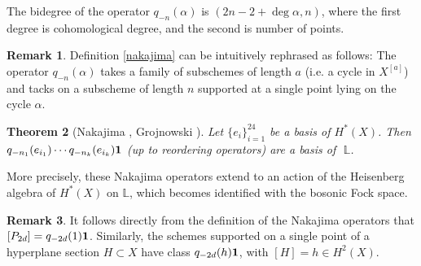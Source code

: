 \documentclass{amsart}
\newtheorem{theorem}{Theorem}[section]
\theoremstyle{definition}
\newtheorem{remark}[theorem]{Remark}
\begin{document}
The bidegree of the operator $q_{-n}(\alpha)$ is $(2n-2+\deg\alpha,n)$, where
the first degree is cohomological degree, and the second is number of points.

\begin{remark} Definition \ref{nakajima} can be
intuitively rephrased as follows: The operator $q_{-n}(\alpha)$ takes a family of
subschemes of length $a$ (i.e. a cycle in $X^{[a]}$)
and tacks on a subscheme of length $n$ supported at a single point lying
on the cycle $\alpha$. \end{remark}

\begin{theorem}[Nakajima \cite{nakajima1997heisenberg},
Grojnowski \cite{grojnowski1996instantons}] Let $\{e_i\}_{i=1}^{24}$ be a basis of $H^*(X)$.
Then $q_{-n_1}(e_{i_1})\cdots q_{-n_k}(e_{i_k}){\bf 1}$
(up to reordering operators) are a basis of~$\,\mathbb{L}$.
 \end{theorem}
 
 More precisely, these Nakajima operators extend to 
 an action of the Heisenberg algebra of
 $H^*(X)$ on $\mathbb{L}$, which becomes identified
with the bosonic Fock space.

\begin{remark} 
It follows directly from the definition of the Nakajima operators
that $[P_{2d}]=q_{-2d}(1){\bf 1}$. Similarly, the schemes supported
on a single point of a hyperplane section $H\subset X$ 
have class $q_{-2d}(h){\bf 1}$, with $[H]=h\in H^2(X)$. \end{remark}
\end{document}
